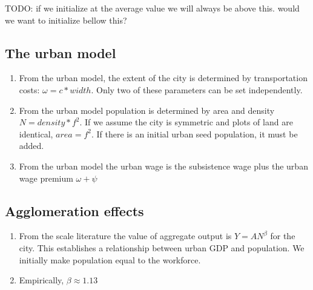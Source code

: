 TODO: if we initialize at the average value we will always be above this. would we want to initialize bellow this?

\subsection{The urban model}
\begin{enumerate}
    \item From the urban model, the extent of the city is determined by transportation costs:   $\omega =c*width$.  Only two of these parameters can be set independently.

    \item From the urban model population is determined by area and density   $N=density* f^2$. If we assume the city is symmetric  and plots  of land are identical, $area=f^2$. If there is an initial urban seed population, it must be added.  
   
    \item From the urban model the urban wage is the subsistence wage plus the urban wage premium $\omega+\psi$ 
\end{enumerate}

\subsection{Agglomeration effects}
\begin{enumerate}
    \item From the scale literature the value of aggregate output is $Y=AN^\beta$ for the city. This establishes a relationship between urban GDP and population. We initially make population equal to the workforce. 

    \item Empirically, $\beta \approx 1.13$
\end{enumerate}

